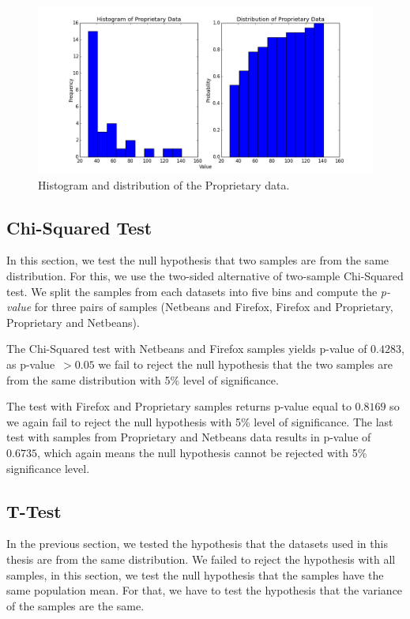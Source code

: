 \begin{figure}[htbp]
    \centering
        \includegraphics[width=\textwidth]{./images/distribution/proprietary.png}
    \caption{Histogram and distribution of the Proprietary data.}
    \label{fig:datasets.proprietary.dist}
\end{figure}

\subsection{Chi-Squared Test}

In this section, we test the null hypothesis that two samples are from the same distribution. For this, we use the two-sided alternative of two-sample Chi-Squared test. We split the samples from each datasets into five bins and compute the \textit{p-value} for three pairs of samples (Netbeans and Firefox, Firefox and Proprietary, Proprietary and Netbeans).

The Chi-Squared test with Netbeans and Firefox samples yields p-value of $0.4283$, as p-value~$> 0.05$ we fail to reject the null hypothesis that the two samples are from the same distribution with 5\% level of significance.

The test with Firefox and Proprietary samples returns p-value equal to $0.8169$ so we again fail to reject the null hypothesis with 5\% level of significance. The last test with samples from Proprietary and Netbeans data results in p-value of $0.6735$, which again means the null hypothesis cannot be rejected with 5\% significance level.

\subsection{T-Test}

In the previous section, we tested the hypothesis that the datasets used in this thesis are from the same distribution. We failed to reject the hypothesis with all samples, in this section, we test the null hypothesis that the samples have the same population mean. For that, we have to test the hypothesis that the variance of the samples are the same.


